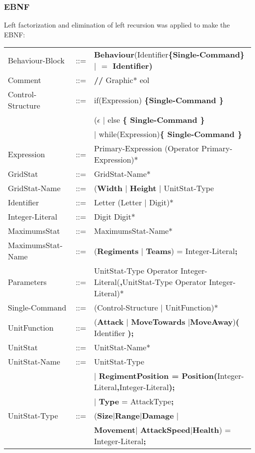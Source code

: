 	\subsubsection{EBNF}
		Left factorization and elimination of left recursion was applied to make the EBNF: \\
		\begin{center}
			\begin{tabular}{ l l p{11cm} }
	Behaviour-Block	   &	::=	 & {\bf Behaviour}(Identifier\bf{\{}Single-Command\bf{\}} $\mid$ {\bf $=$} Identifier)\\
	Comment			   &    ::=  & {\bf //} Graphic* eol\\
	Control-Structure  &  	::=  & if(Expression) \bf{\{}Single-Command \bf{\}}\\
					   &  	     & ($\epsilon$ $\mid$ else \bf{\{ }Single-Command \bf{\} }\\					   
					   &   		 & $\mid$ while(Expression)\bf{\{ } Single-Command \bf{\}}\\
	Expression 		   &	::=	 & Primary-Expression (Operator Primary-Expression)*\\	
	GridStat		   &	::=  & GridStat-Name*\\	
	GridStat-Name	   &	::=  & ({\bf Width} $\mid$ {\bf Height} $\mid$ UnitStat-Type\\
	
	Identifier 		   &    ::=  & Letter (Letter $\mid$ Digit)*\\
	Integer-Literal    &	::=  & Digit Digit*\\
	MaximumsStat	   &	::=  & MaximumsStat-Name*\\
	MaximumsStat-Name  &	::=  & ({\bf Regiments }$\mid$ {\bf Teams}) =  Integer-Literal{\bf ;}\\				
										  						   				
	Parameters		   &	::=	 & UnitStat-Type Operator Integer-Literal({\bf ,}UnitStat-Type Operator Integer-Literal)*\\
	Single-Command     &	::=  & (Control-Structure $\mid$ UnitFunction)*\\		
	UnitFunction	   &	::=	 & ({\bf Attack} $\mid$ {\bf MoveTowards} $\mid${\bf MoveAway}){\bf (} Identifier {\bf );}\\
	UnitStat		   &	::=  & UnitStat-Name*\\
	UnitStat-Name	   &	::=	 & UnitStat-Type\\ 
					   &	     & $\mid$ {\bf RegimentPosition = Position(}Integer-Literal{\bf ,}Integer-Literal{\bf );}\\
					   &		 & $\mid$ {\bf Type} = AttackType{\bf ;}\\
	UnitStat-Type	   &	::=  & ({\bf Size}$\mid${\bf Range}$\mid${\bf Damage} $\mid$\\
					   &	     & {\bf Movement}$\mid$ {\bf AttackSpeed}$\mid${\bf Health}) = Integer-Literal{\bf ;}\\ 



			
			\end{tabular}
		\end{center}					     